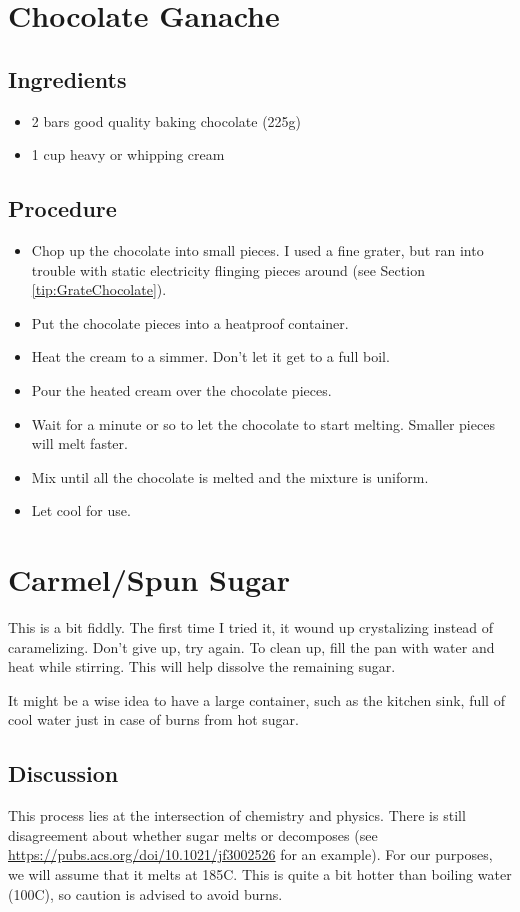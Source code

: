\documentclass[10pt, openany]{book}
\begin{document}
\section{Chocolate Ganache}
\label{extra:ChocolateGanache}
\subsection{Ingredients}
\begin{itemize}
  \item 2 bars good quality baking chocolate (225g)
  \item 1 cup heavy or whipping cream
\end{itemize}
\subsection{Procedure}
\begin{itemize}
  \item Chop up the chocolate into small pieces.  I used a fine grater, but ran into trouble with static electricity flinging pieces around (see Section \ref{tip:GrateChocolate}).
  \item Put the chocolate pieces into a heatproof container.
  \item Heat the cream to a simmer.  Don't let it get to a full boil.
  \item Pour the heated cream over the chocolate pieces.
  \item Wait for a minute or so to let the chocolate to start melting.  Smaller pieces will melt faster.
  \item Mix until all the chocolate is melted and the mixture is uniform.
  \item Let cool for use.
\end{itemize}

\section{Carmel/Spun Sugar}
This is a bit fiddly.  The first time I tried it, it wound up crystalizing instead of caramelizing.  Don't give up, try again.  To clean up, fill the pan with water and heat while stirring.  This will help dissolve the remaining sugar.

It might be a wise idea to have a large container, such as the kitchen sink, full of cool water just in case of burns from hot sugar.

\subsection{Discussion}
This process lies at the intersection of chemistry and physics.  There is still disagreement about whether sugar melts or decomposes (see \url{https://pubs.acs.org/doi/10.1021/jf3002526} for an example).  For our purposes, we will assume that it melts at 185\degree{}C.  This is quite a bit hotter than boiling water (100\degree{}C), so caution is advised to avoid burns.
\end{document}
